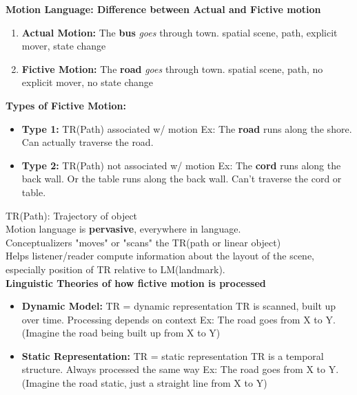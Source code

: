 \documentclass{article}
\begin{document}
\noindent \textbf{Motion Language: Difference between Actual and Fictive motion}

\begin{enumerate}
    \item \textbf{Actual Motion:} The \textbf{bus} \textit{goes} through town.
        \subitem spatial scene, path, explicit mover, state change
    \item \textbf{Fictive Motion:} The \textbf{road} \textit{goes} through town. 
        \subitem spatial scene, path, no explicit mover, no state change
\end{enumerate}

\noindent \textbf{Types of Fictive Motion:} 
\begin{itemize}
    \item \textbf{Type 1:} TR(Path) associated w/ motion 
        \subitem Ex: The \textbf{road} runs along the shore. Can actually traverse the road.
    \item \textbf{Type 2:} TR(Path) not associated w/ motion 
        \subitem Ex: The \textbf{cord} runs along the back wall. Or the table runs along the back wall. Can't traverse the cord or table.  
\end{itemize}
TR(Path): Trajectory of object \\

\noindent Motion language is \textbf{pervasive},  everywhere in language. \\
Conceptualizers "moves" or "scans" the TR(path or linear object) \\
Helps listener/reader compute information about the layout of the scene, especially position of TR relative to LM(landmark). \\

\noindent \textbf{Linguistic Theories of how fictive motion is processed}
\begin{itemize}
    \item \textbf{Dynamic Model:} TR = dynamic representation
        \subitem TR is scanned, built up over time. 
        \subitem Processing depends on context
        \subitem Ex: The road goes from X to Y. (Imagine the road being built up from X to Y)
    \item \textbf{Static Representation:} TR = static representation
        \subitem TR is a temporal structure. 
        \subitem Always processed the same way
        \subitem Ex: The road goes from X to Y. (Imagine the road static, just a straight line from X to Y)
\end{itemize}
\end{document}
